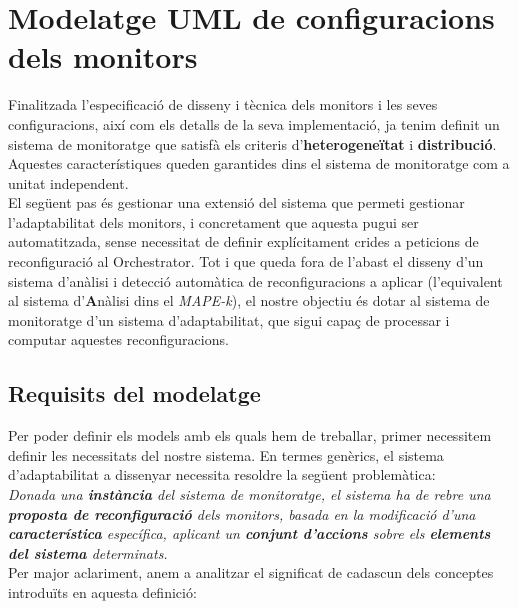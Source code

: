 
\chapter{Modelatge UML de configuracions dels monitors} %

\label{ModelatgeConfiguracions} %


Finalitzada l'especificació de disseny i tècnica dels monitors i les seves configuracions, així com els detalls de la seva implementació, ja tenim definit un sistema de monitoratge que satisfà els criteris d'\textbf{heterogeneïtat} i \textbf{distribució}. Aquestes característiques queden garantides dins el sistema de monitoratge com a unitat independent.\\

El següent pas és gestionar una extensió del sistema que permeti gestionar l'adaptabilitat dels monitors, i concretament que aquesta pugui ser automatitzada, sense necessitat de definir explícitament crides a peticions de reconfiguració al Orchestrator. Tot i que queda fora de l'abast el disseny d'un sistema d'anàlisi i detecció automàtica de reconfiguracions a aplicar (l'equivalent al sistema d'\textbf{A}nàlisi dins el \textit{MAPE-k}), el nostre objectiu és dotar al sistema de monitoratge d'un sistema d'adaptabilitat, que sigui capaç de processar i computar aquestes reconfiguracions.\\

\section{Requisits del modelatge}

Per poder definir els models amb els quals hem de treballar, primer necessitem definir les necessitats del nostre sistema. En termes genèrics, el sistema d'adaptabilitat a dissenyar necessita resoldre la següent problemàtica:\\

\textit{Donada una \textbf{instància} del sistema de monitoratge, el sistema ha de rebre una \textbf{proposta de reconfiguració} dels monitors, basada en la modificació d'una \textbf{característica} específica, aplicant un \textbf{conjunt d'accions} sobre els \textbf{elements del sistema} determinats.}\\

Per major aclariment, anem a analitzar el significat de cadascun dels conceptes introduïts en aquesta definició:

